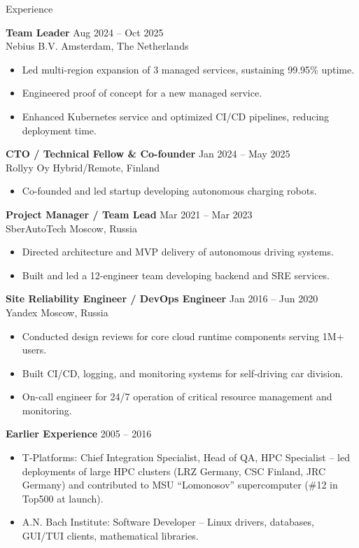 \documentclass{resume} %
\begin{document}
\begin{rSection}{Experience}

\textbf{Team Leader} \hfill Aug 2024 -- Oct 2025 \\
Nebius B.V. \hfill Amsterdam, The Netherlands
\begin{itemize}
  \item Led multi-region expansion of 3 managed services, sustaining 99.95\% uptime.
  \item Engineered proof of concept for a new managed service.
  \item Enhanced Kubernetes service and optimized CI/CD pipelines, reducing deployment time.
\end{itemize}

\textbf{CTO / Technical Fellow \& Co-founder} \hfill Jan 2024 -- May 2025 \\
Rollyy Oy \hfill Hybrid/Remote, Finland
\begin{itemize}
  \item Co-founded and led startup developing autonomous charging robots.
\end{itemize}

\textbf{Project Manager / Team Lead} \hfill Mar 2021 -- Mar 2023 \\
SberAutoTech \hfill Moscow, Russia
\begin{itemize}
  \item Directed architecture and MVP delivery of autonomous driving systems.
  \item Built and led a 12-engineer team developing backend and SRE services.
\end{itemize}

\textbf{Site Reliability Engineer / DevOps Engineer} \hfill Jan 2016 -- Jun 2020 \\
Yandex \hfill Moscow, Russia
\begin{itemize}
  \item Conducted design reviews for core cloud runtime components serving 1M+ users.
  \item Built CI/CD, logging, and monitoring systems for self-driving car division.
  \item On-call engineer for 24/7 operation of critical resource management and monitoring.
\end{itemize}

\textbf{Earlier Experience} \hfill 2005 -- 2016
\begin{itemize}
  \item T-Platforms: Chief Integration Specialist, Head of QA, HPC Specialist – led deployments of large HPC clusters (LRZ Germany, CSC Finland, JRC Germany) and contributed to MSU “Lomonosov” supercomputer (\#12 in Top500 at launch).
  \item A.N. Bach Institute: Software Developer – Linux drivers, databases, GUI/TUI clients, mathematical libraries.
\end{itemize}

\end{rSection}
\end{document}
